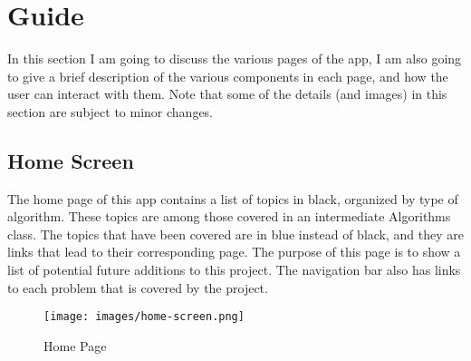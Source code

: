 \chapter{Guide}
In this section I am going to discuss the various pages of the app, 
I am also going to give a brief description of the various components in each page,
and how the user can interact with them.
Note that some of the details (and images) in this section are subject to minor changes.
\section{Home Screen}
The home page of this app contains a list of topics in black, 
organized by type of algorithm. 
These topics are among those covered in an intermediate Algorithms class. 
The topics that have been covered are in blue instead of black,
and they are links that lead to their corresponding page. 
The purpose of this page is to show a list of potential future additions 
to this project. 
The navigation bar also has links to each problem that is covered by the project. 
	\begin{figure}[h]
		\caption{Home Page}
		\texttt{[image: images/home-screen.png]}
		\centering
	\end{figure}
